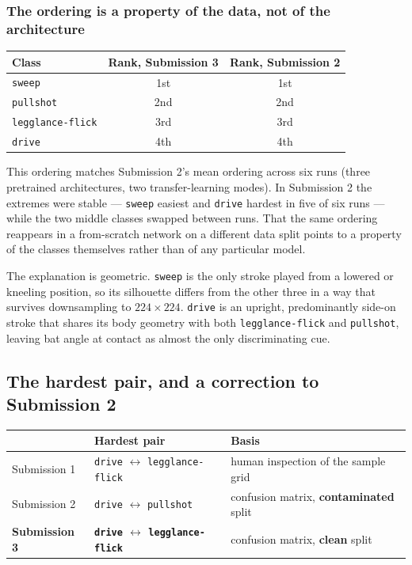 \documentclass[11pt,a4paper]{article}
\begin{document}
\subsubsection*{The ordering is a property of the data, not of the architecture}

\begin{center}
\begin{tabular}{@{}lcc@{}}
\toprule
\textbf{Class} & \textbf{Rank, Submission 3} & \textbf{Rank, Submission 2} \\
\midrule
\texttt{sweep}           & 1st & 1st \\
\texttt{pullshot}        & 2nd & 2nd \\
\texttt{legglance-flick} & 3rd & 3rd \\
\texttt{drive}           & 4th & 4th \\
\bottomrule
\end{tabular}
\end{center}

This ordering matches Submission 2's mean ordering across six runs (three pretrained
architectures, two transfer-learning modes). In Submission 2 the extremes were stable
--- \texttt{sweep} easiest and \texttt{drive} hardest in five of six runs --- while the two
middle classes swapped between runs. That the same ordering reappears in a from-scratch
network on a different data split points to a property of the classes themselves rather
than of any particular model.

The explanation is geometric. \texttt{sweep} is the only stroke played from a lowered or
kneeling position, so its silhouette differs from the other three in a way that survives
downsampling to $224 \times 224$. \texttt{drive} is an upright, predominantly side-on
stroke that shares its body geometry with both \texttt{legglance-flick} and
\texttt{pullshot}, leaving bat angle at contact as almost the only discriminating cue.

\subsection{The hardest pair, and a correction to Submission 2}

\begin{center}
\begin{tabular}{@{}lll@{}}
\toprule
& \textbf{Hardest pair} & \textbf{Basis} \\
\midrule
Submission 1 & \texttt{drive} $\leftrightarrow$ \texttt{legglance-flick} & human inspection of the sample grid \\
Submission 2 & \texttt{drive} $\leftrightarrow$ \texttt{pullshot} & confusion matrix, \textbf{contaminated} split \\
\textbf{Submission 3} & \textbf{\texttt{drive} $\leftrightarrow$ \texttt{legglance-flick}} & confusion matrix, \textbf{clean} split \\
\bottomrule
\end{tabular}
\end{center}
\end{document}

